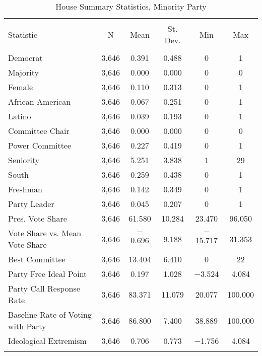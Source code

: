 \documentclass[12pt]{article}
\begin{document}
\begin{table}[!htbp] \centering 
	\caption{House Summary Statistics, Minority Party} 
	\label{} 
	\begin{tabular}{@{\extracolsep{5pt}}lccccc} 
		\\[-1.8ex]\hline 
		\hline \\[-1.8ex] 
		Statistic & \multicolumn{1}{c}{N} & \multicolumn{1}{c}{Mean} & \multicolumn{1}{c}{St. Dev.} & \multicolumn{1}{c}{Min} & \multicolumn{1}{c}{Max} \\ 
		\hline \\[-1.8ex] 
		Democrat & 3,646 & 0.391 & 0.488 & 0 & 1 \\ 
		Majority & 3,646 & 0.000 & 0.000 & 0 & 0 \\ 
		Female & 3,646 & 0.110 & 0.313 & 0 & 1 \\ 
		African American & 3,646 & 0.067 & 0.251 & 0 & 1 \\ 
		Latino & 3,646 & 0.039 & 0.193 & 0 & 1 \\ 
		Committee Chair & 3,646 & 0.000 & 0.000 & 0 & 0 \\ 
		Power Committee & 3,646 & 0.227 & 0.419 & 0 & 1 \\ 
		Seniority & 3,646 & 5.251 & 3.838 & 1 & 29 \\ 
		South & 3,646 & 0.259 & 0.438 & 0 & 1 \\ 
		Freshman & 3,646 & 0.142 & 0.349 & 0 & 1 \\ 
		Party Leader & 3,646 & 0.045 & 0.207 & 0 & 1 \\ 
		Pres. Vote Share & 3,646 & 61.580 & 10.284 & 23.470 & 96.050 \\ 
		Vote Share vs. Mean Vote Share & 3,646 & $-$0.696 & 9.188 & $-$15.717 & 31.353 \\ 
		Best Committee & 3,646 & 13.404 & 6.410 & 0 & 22 \\ 
		Party Free Ideal Point & 3,646 & 0.197 & 1.028 & $-$3.524 & 4.084 \\ 
		Party Call Response Rate & 3,646 & 83.371 & 11.079 & 20.077 & 100.000 \\ 
		Baseline Rate of Voting with Party & 3,646 & 86.800 & 7.400 & 38.889 & 100.000 \\ 
		Ideological Extremism & 3,646 & 0.706 & 0.773 & $-$1.756 & 4.084 \\ 
		\hline \\[-1.8ex] 
	\end{tabular} 
\end{table} 
\end{document}
